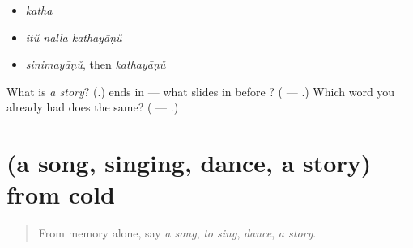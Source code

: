 \begin{itemize}
\raggedright
  \item \emph{katha}
  \item \emph{itŭ nalla kathayāṇŭ}
  \item \emph{sinimayāṇŭ}, then \emph{kathayāṇŭ}
\end{itemize}

\begin{tcolorbox}[breakable,colback=teal!4,colframe=teal!35!black,title={Before you move on}]
What is \emph{a story}? (\textbf{}.) \textbf{} ends in \textbf{} — what slides in before \textbf{}? (\textbf{} — \textbf{}.) Which word you already had does the same? (\textbf{} — \textbf{}.)
\end{tcolorbox}
\section[(a song, singing, dance, a story)]{(a song, singing, dance, a story) — from cold}

\label{lesson:ML-R99-arts-recall}



\begin{quote}
From memory alone, say \emph{a song}, \emph{to sing}, \emph{dance}, \emph{a story}.
\end{quote}

